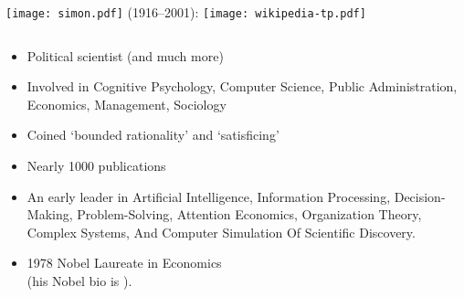 \begin{frame}

  \begin{block}{}
    \begin{columns}
      \texttt{[image: simon.pdf]}
       (1916--2001):
      \texttt{[image: wikipedia-tp.pdf]}
    \end{columns}
  \begin{itemize}
  \item<+-> 
    Political scientist (and much more)
  \item<+-> 
    Involved in Cognitive Psychology, Computer Science, Public Administration,
    Economics, Management, Sociology
  \item<+-> 
    Coined `bounded rationality' and `satisficing'
  \item<+-> 
    Nearly 1000 publications
  \item<+-> 
    An early leader in
    Artificial Intelligence, Information Processing,
    Decision-Making, Problem-Solving, Attention Economics, Organization
    Theory, Complex Systems, And Computer Simulation Of Scientific
    Discovery. 
  \item<+-> 
    1978 Nobel Laureate in Economics\\
    (his Nobel bio is ).
  \end{itemize}
  \end{block}

\end{frame}


